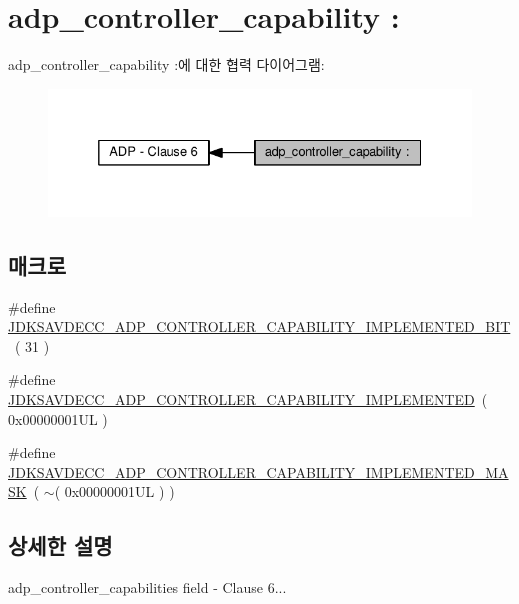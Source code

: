 \hypertarget{group__adp__controller__capability}{}\section{adp\+\_\+controller\+\_\+capability \+:}
\label{group__adp__controller__capability}
adp\+\_\+controller\+\_\+capability \+:에 대한 협력 다이어그램\+:
\nopagebreak
\begin{figure}[H]
\begin{center}
\leavevmode
\includegraphics[width=332pt]{group__adp__controller__capability}
\end{center}
\end{figure}
\subsection*{매크로}
\begin{DoxyCompactItemize}
\item 
\#define \hyperlink{group__adp__controller__capability_ga34098d8031e7749869b4c2b97d9321af}{J\+D\+K\+S\+A\+V\+D\+E\+C\+C\+\_\+\+A\+D\+P\+\_\+\+C\+O\+N\+T\+R\+O\+L\+L\+E\+R\+\_\+\+C\+A\+P\+A\+B\+I\+L\+I\+T\+Y\+\_\+\+I\+M\+P\+L\+E\+M\+E\+N\+T\+E\+D\+\_\+\+B\+IT}~( 31 )
\item 
\#define \hyperlink{group__adp__controller__capability_ga1dfc12e568b168ad6c0f6cdecca7b39e}{J\+D\+K\+S\+A\+V\+D\+E\+C\+C\+\_\+\+A\+D\+P\+\_\+\+C\+O\+N\+T\+R\+O\+L\+L\+E\+R\+\_\+\+C\+A\+P\+A\+B\+I\+L\+I\+T\+Y\+\_\+\+I\+M\+P\+L\+E\+M\+E\+N\+T\+ED}~( 0x00000001\+U\+L )
\item 
\#define \hyperlink{group__adp__controller__capability_ga120849eebab9fb67e0aa5f1b3646821c}{J\+D\+K\+S\+A\+V\+D\+E\+C\+C\+\_\+\+A\+D\+P\+\_\+\+C\+O\+N\+T\+R\+O\+L\+L\+E\+R\+\_\+\+C\+A\+P\+A\+B\+I\+L\+I\+T\+Y\+\_\+\+I\+M\+P\+L\+E\+M\+E\+N\+T\+E\+D\+\_\+\+M\+A\+SK}~( $\sim$( 0x00000001\+U\+L ) )
\end{DoxyCompactItemize}


\subsection{상세한 설명}
adp\+\_\+controller\+\_\+capabilities field -\/ Clause 6... 

